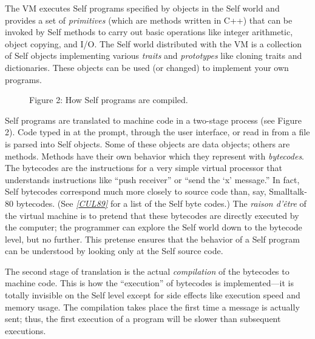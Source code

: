 \documentclass[letterpaper,10pt,english]{sphinxmanual}
\begin{document}
The VM executes Self programs specified by objects in the Self world and provides a set of \emph{primitives} (which are methods written in C++) that can be invoked by Self methods to carry out basic operations like integer arithmetic, object copying, and I/O. The Self world distributed with the VM is a collection of Self objects implementing various \emph{traits} and \emph{prototypes} like cloning traits and dictionaries. These objects can be used (or changed) to implement your own programs.
\begin{figure}[htbp]\begin{flushleft}
\capstart

\caption{Figure 2: How Self programs are compiled.}\end{flushleft}\end{figure}

Self programs are translated to machine code in a two-stage process (see Figure 2). Code typed in at the prompt, through the user interface, or read in from a file is parsed into Self objects. Some of these objects are data objects; others are methods. Methods have their own behavior which they represent with \emph{bytecodes}. The bytecodes are the instructions for a very simple virtual processor that understands instructions like “push receiver” or “send the ‘x’ message.” In fact, Self bytecodes correspond much more closely to source code than, say, Smalltalk-80 bytecodes. (See {\hyperref[ref:citations]{\emph{{[}CUL89{]}}}} for a list of the Self byte codes.) The \emph{raison d’être} of the virtual machine is to pretend that these bytecodes are directly executed by the computer; the programmer can explore the Self world down to the bytecode level, but no further. This pretense ensures that the behavior of a Self program can be understood by looking only at the Self source code.

The second stage of translation is the actual \emph{compilation} of the bytecodes to machine code. This is how the “execution” of bytecodes is implemented—it is totally invisible on the Self level except for side effects like execution speed and memory usage. The compilation takes place the first time a message is actually sent; thus, the first execution of a program will be slower than subsequent executions.
\end{document}
